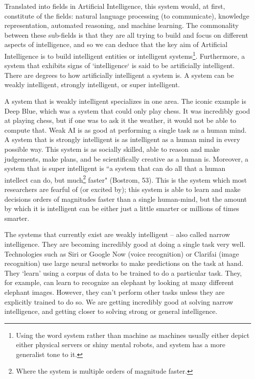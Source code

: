\documentclass[11pt]{article}
\begin{document}
\par Translated into fields in Artificial Intelligence, this system would, at first, constitute of the fields: natural language processing (to communicate), knowledge representation, automated reasoning, and machine learning. The commonality between these sub-fields is that they are all trying to build and focus on different aspects of intelligence, and so we can deduce that the key aim of Artificial Intelligence is to build intelligent entities or intelligent systems\footnote{Using the word system rather than machine as machines usually either depict either physical servers or shiny mental robots, and system has a more generalist tone to it.}. Furthermore, a system that exhibits signs of `intelligence` is said to be artificially intelligent. There are degrees to how artificially intelligent a system is. A system can be weakly intelligent, strongly intelligent, or super intelligent. 

\par A system that is weakly intelligent specializes in one area. The iconic example is Deep Blue, which was a system that could only play chess. It was incredibly good at playing chess, but if one was to ask it the weather, it would not be able to compute that. Weak AI is as good at performing a single task as a human mind. A system that is strongly intelligent is as intelligent as a human mind in every possible way. This system is as socially skilled, able to reason and make judgements, make plans, and be scientifically creative as a human is. Moreover, a system that is super intelligent is ``a system that can do all that a human intellect can do, but much\footnote{Where the system is multiple orders of magnitude faster.} faster" (Bostrom, 53). This is the system which most researchers are fearful of (or excited by); this system is able to learn and make decisions orders of magnitudes faster than a single human-mind, but the amount by which it is intelligent can be either just a little smarter or millions of times smarter.

\par The systems that currently exist are weakly intelligent -- also called narrow intelligence. They are becoming incredibly good at doing a single task very well. Technologies such as Siri or Google Now (voice recognition) or Clarifai (image recognition) use large neural networks to make predictions on the task at hand. They `learn' using a corpus of data to be trained to do a particular task. They, for example, can learn to recognize an elephant by looking at many different elephant images. However, they can't perform other tasks unless they are explicitly trained to do so. We are getting incredibly good at solving narrow intelligence, and getting closer to solving strong or general intelligence.
\end{document}
